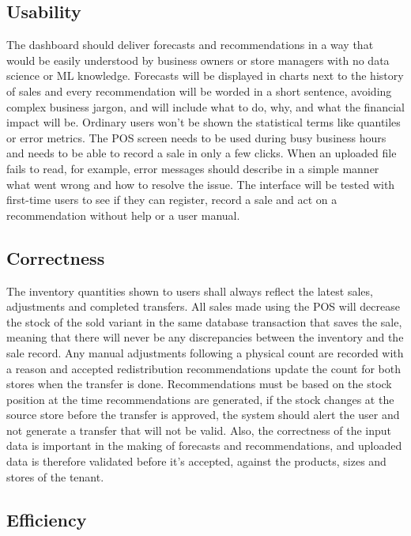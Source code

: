 \documentclass{StockSense}
\begin{document}
\subsection{Usability}

The dashboard should deliver forecasts and recommendations in a way that would be easily understood by business owners or store managers with no data science or ML knowledge. Forecasts will be displayed in charts next to the history of sales and every recommendation will be worded in a short sentence, avoiding complex business jargon, and will include what to do, why, and what the financial impact will be. Ordinary users won't be shown the statistical terms like quantiles or error metrics. The POS screen needs to be used during busy business hours and needs to be able to record a sale in only a few clicks. When an uploaded file fails to read, for example, error messages should describe in a simple manner what went wrong and how to resolve the issue. The interface will be tested with first-time users to see if they can register, record a sale and act on a recommendation without help or a user manual.

\subsection{Correctness}

The inventory quantities shown to users shall always reflect the latest sales, adjustments and completed transfers. All sales made using the POS will decrease the stock of the sold variant in the same database transaction that saves the sale, meaning that there will never be any discrepancies between the inventory and the sale record. Any manual adjustments following a physical count are recorded with a reason and accepted redistribution recommendations update the count for both stores when the transfer is done. Recommendations must be based on the stock position at the time recommendations are generated, if the stock changes at the source store before the transfer is approved, the system should alert the user and not generate a transfer that will not be valid. Also, the correctness of the input data is important in the making of forecasts and recommendations, and uploaded data is therefore validated before it's accepted, against the products, sizes and stores of the tenant.

\subsection{Efficiency}
\end{document}
